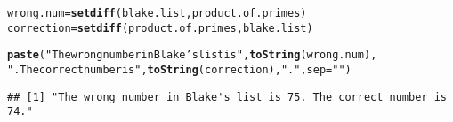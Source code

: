 \documentclass{article}\usepackage[]{graphicx}\usepackage[]{xcolor}
\makeatletter
\newcommand{\hlsng}[1]{\textcolor[rgb]{0.192,0.494,0.8}{#1}}%
\newcommand{\hldef}[1]{\textcolor[rgb]{0.345,0.345,0.345}{#1}}%
\newcommand{\hlkwb}[1]{\textcolor[rgb]{0.69,0.353,0.396}{#1}}%
\newcommand{\hlkwc}[1]{\textcolor[rgb]{0.333,0.667,0.333}{#1}}%
\newcommand{\hlkwd}[1]{\textcolor[rgb]{0.737,0.353,0.396}{\textbf{#1}}}%
\newenvironment{kframe}{%
 \def\at@end@of@kframe{}%
 \ifinner\ifhmode%
  \def\at@end@of@kframe{\end{minipage}}%
  \begin{minipage}{\columnwidth}%
 \fi\fi%
 \def\FrameCommand##1{\hskip\@totalleftmargin \hskip-\fboxsep
 \colorbox{shadecolor}{##1}\hskip-\fboxsep
     \hskip-\linewidth \hskip-\@totalleftmargin \hskip\columnwidth}%
 \MakeFramed {\advance\hsize-\width
   \@totalleftmargin\z@ \linewidth\hsize
   \@setminipage}}%
 {\par\unskip\endMakeFramed%
 \at@end@of@kframe}
\newenvironment{knitrout}{}{} %
\makeatother
\begin{document}
\begin{enumerate}
\begin{knitrout}
\begin{kframe}
\begin{alltt}
\hldef{wrong.num} \hlkwb{=} \hlkwd{setdiff}\hldef{(blake.list, product.of.primes)}
\hldef{correction} \hlkwb{=} \hlkwd{setdiff}\hldef{(product.of.primes, blake.list)}

\hlkwd{paste}\hldef{(}\hlsng{"The wrong number in Blake's list is "}\hldef{,} \hlkwd{toString}\hldef{(wrong.num),}
      \hlsng{". The correct number is "}\hldef{,} \hlkwd{toString}\hldef{(correction),} \hlsng{"."}\hldef{,} \hlkwc{sep} \hldef{=} \hlsng{""}\hldef{)}
\end{alltt}
\begin{verbatim}
## [1] "The wrong number in Blake's list is 75. The correct number is 74."
\end{verbatim}
\end{kframe}
\end{knitrout}
\end{enumerate}


\end{document}
